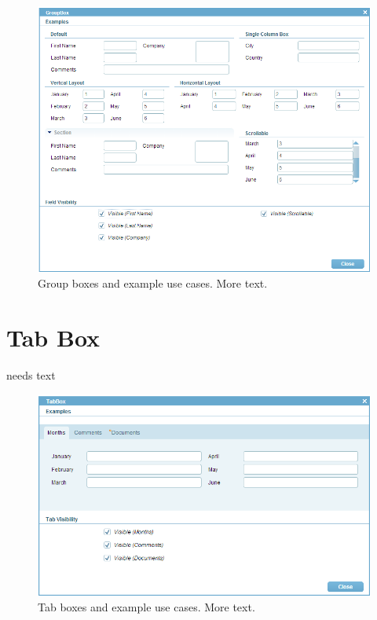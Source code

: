 \documentclass[a4paper,10pt,twoside]{book}
\begin{document}
{\begin{figure}
\includegraphics[width=15cm]{groupbox.png}
\caption{Group boxes and example use cases.
More text.}
\end{figure}

\section{Tab Box}
needs text

\begin{figure}
\includegraphics[width=15cm]{tabbox.png}
\caption{Tab boxes and example use cases.
More text.}
\end{figure}

}
\end{document}
